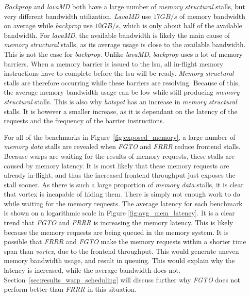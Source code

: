 \textit{Backprop} and \textit{lavaMD} both have a large number of \textit{memory structural} stalls, but very different bandwidth utilization. \textit{LavaMD} use $17GB/s$ of memory bandwidth on average while \textit{backprop} use $10GB/s$, which is only about half of the available bandwidth. For \textit{lavaMD}, the available bandwidth is likely the main cause of \textit{memory structural} stalls, as its average usage is close to the available bandwidth. This is not the case for \textit{backprop}. Unlike \textit{lavaMD}, \textit{backprop} uses a lot of memory barriers. When a memory barrier is issued to the \acrshort{lsu}, all in-flight memory instructions have to complete before the \acrshort{lsu} will be ready. \textit{Memory structural} stalls are therefore occurring while these barriers are resolving. Because of this, the average memory bandwidth usage can be low while still producing \textit{memory structural} stalls. This is also why \textit{hotspot} has an increase in \textit{memory structural} stalls. It is however a smaller increase, as it is dependant on the latency of the requests and the frequency of the barrier instructions.

For all of the benchmarks in Figure~\ref{fig:exposed_memory}, a large number of \textit{memory data} stalls are revealed when \textit{FGTO} and \textit{FRRR} reduce frontend stalls. Because warps are waiting for the results of memory requests, these stalls are caused by memory latency. It is most likely that these memory requests are already in-flight, and thus the increased frontend throughput just exposes the stall sooner. As there is such a large proportion of \textit{memory data} stalls, it is clear that \Gls{vortex} is incapable of hiding them. There is simply not enough work to do while waiting for the memory requests. The average latency for each benchmark is shown on a logarithmic scale in Figure \ref{fig:avg_mem_latency}. It is a clear trend that \textit{FGTO} and \textit{FRRR} is increasing the memory latency. This is likely because the memory requests are being queued in the memory system. It is possible that \textit{FRRR} and \textit{FGTO} make the memory requests within a shorter time span than \textit{\Gls{vortex}}, due to the frontend throughput. This would generate uneven memory bandwidth usage, and result in queuing. This would explain why the latency is increased, while the average bandwidth does not. Section~\ref{sec:results_warp_scheduling} will discuss further why \textit{FGTO} does not perform better than \textit{FRRR} in this situation.

